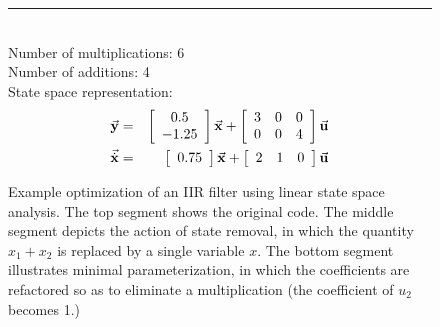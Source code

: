 \begin{figure}[t]
\begin{singlespace}
{\begin{minipage}{3.5in}
\begin{eqnarray*}
\end{eqnarray*}
\vspace{-3pt} ~ \\
\hrule
\vspace{12pt} ~ \\
Number of multiplications: 6 \\
Number of additions: 4 \\
State space representation:
\begin{eqnarray*}
\small
\vec{\mathbf{y}} & = & \left [ \begin{array} {cc} 0.5 \\ -1.25
\end{array} \right ] \vec{\mathbf{x}} + \left [ \begin{array} {ccc} 3 & 0 & 0 \\ 0 & 0 & 4 \end{array} \right
 ] \vec{\mathbf{u}} \\
\vec{\dot{\mathbf{x}}} & = & \left [ \begin{array} {cc} 0.75
\end{array} \right ] \vec{\mathbf{x}} + \left [ \begin{array} {ccc} 2 & 1 & 0 \end{array} \right ] \vec{\mathbf{u}}
\end{eqnarray*}
\end{minipage}}
\end{singlespace}
\begin{center}
\vspace{-24pt}

\caption{Example optimization of an IIR filter using linear state
space analysis.  The top segment shows the original code.  The middle
segment depicts the action of state removal, in which the quantity
$x_1 + x_2$ is replaced by a single variable $x$.  The bottom segment
illustrates minimal parameterization, in which the coefficients are
refactored so as to eliminate a multiplication (the coefficient of
$u_2$ becomes 1.)\protect\label{fig:opt-seq}}
\end{center}
\vspace{-12pt}
\end{figure}
